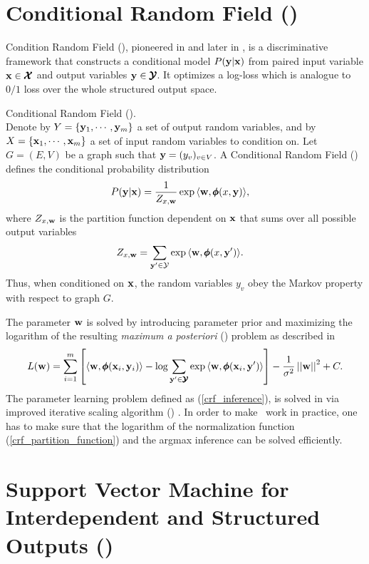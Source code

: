 {\section{Conditional Random Field (\crf)}
Condition Random Field (\crf), pioneered in \citep{lafferty01} and later in \citep{taskar02}, is a discriminative framework that constructs a conditional model $P(\mathbf {y}|\mathbf {x})$ from paired input variable $\mathbf {x}\in\pmb {\mathcal{X}}$ and output variables $\mathbf {y}\in\pmb {\mathcal{Y}}$.
It optimizes a log-loss which is analogue to $0/1$ loss over the whole structured output space.
\begin{definition}{Conditional Random Field (\crf).}\\
	Denote by $Y=\{\mathbf {y}_1,\cdots,\mathbf {y}_m\}$ a set of output random variables, and by $X=\{\mathbf {x}_1,\cdots,\mathbf {x}_m\}$ a set of input random variables to condition on.
	Let $G=(E,V)$ be a graph such that $\mathbf {y} = (y_v)_{v\in V}$.
	A Conditional Random Field (\crf) defines the conditional probability distribution
	\begin{align*}
		P(\mathbf {y}|\mathbf {x}) &= \frac{1}{Z_{x,\mathbf {w}}}\exp{\langle \mathbf {w}, \pmb \phi(x,\mathbf {y}) \rangle},
	\end{align*}
	where $Z_{x,\mathbf {w}}$ is the partition function dependent on $\mathbf {x}$ that sums over all possible output variables 
	\begin{align}
		Z_{x,\mathbf {w}} &= \sum_{\mathbf {y}'\in\mathcal{Y}}\exp{\langle \mathbf {w}, \pmb \phi(x,\mathbf {y}') \rangle}. \label{crf_partition_function}
	\end{align}
	Thus, when conditioned on $\mathbf {x}$, the random variables $y_v$ obey the Markov property with respect to graph $G$.
\end{definition}

The parameter $\mathbf {w}$ is solved by introducing parameter prior and maximizing the logarithm of the resulting \textit{maximum a posteriori} (\map) problem as described in \citep{taskar02}
\begin{align}
	L(\mathbf {w}) = \sum_{i=1}^{m}\left[\langle \mathbf {w}, \pmb \phi(\mathbf {x}_i,\mathbf {y}_i) \rangle-\log{\sum_{\mathbf {y}'\in\pmb {\mathcal{Y}}}{\exp{\langle \mathbf {w}, \pmb \phi(\mathbf {x}_i,\mathbf {y}') \rangle}}}\right] - \frac{1}{\sigma^2}\left|\left| \mathbf {w} \right|\right|^2 + C. \label{crf_inference}
\end{align}
The parameter learning problem defined as (\ref{crf_inference}), is solved in \citep{lafferty01} via improved iterative scaling algorithm (\iis) \citep{Pietra97inducing}.
In order to make \crf\ work in practice, one has to make sure that the logarithm of the normalization function (\ref{crf_partition_function}) and the argmax inference can be solved efficiently.


%
% 
\section{Support Vector Machine for Interdependent and Structured Outputs (\svmstruct)}

}

